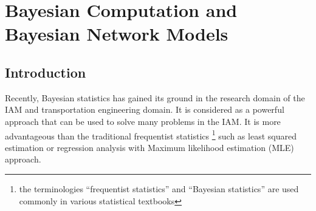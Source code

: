 %
%
%
\chapter{Bayesian Computation and Bayesian Network Models}
\label{bayesianchapter} %
\section{Introduction}

% 
% 
% 
Recently, Bayesian statistics has gained its ground in the research domain of the IAM and transportation engineering domain. It is considered as a powerful approach that can be used to solve many problems in the IAM. It is more advantageous than the traditional frequentist statistics \footnote{the terminologies ``frequentist statistics'' and ``Bayesian statistics'' are used commonly in various statistical textbooks} such as least squared estimation or regression analysis with Maximum likelihood estimation (MLE) approach. 

